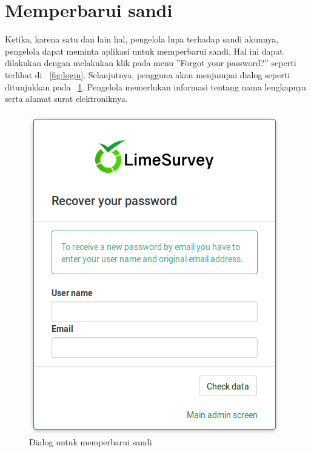 \section{Memperbarui sandi}
Ketika, karena satu dan lain hal, pengelola lupa terhadap sandi akunnya, pengelola dapat meminta aplikasi untuk memperbarui sandi. Hal ini dapat dilakukan dengan melakukan klik pada menu ''Forgot your password?'' seperti terlihat di \figurename~\ref{fig:login}. Selanjutnya, pengguna akan menjumpai dialog seperti ditunjukkan pada \figurename~\ref{fig:recoverySandi}. Pengelola memerlukan informasi tentang nama lengkapnya serta alamat surat elektroniknya.

\begin{figure}
  \begin{center}
    \includegraphics[scale=.35]{pics/recoverPasswd.png}
    \caption{Dialog untuk memperbarui sandi}
    \label{fig:recoverySandi}
  \end{center}
\end{figure}

